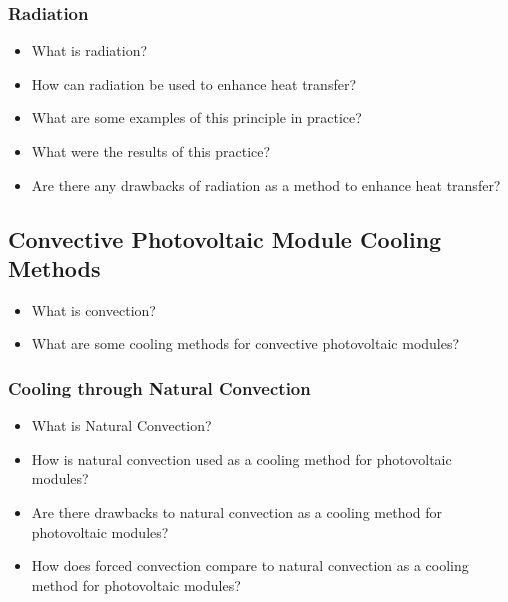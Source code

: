 \subsubsection{Radiation}
\begin{itemize}
    \item What is radiation?
    \item How can radiation be used to enhance heat transfer?
    \item What are some examples of this principle in practice?
    \item What were the results of this practice?
    \item Are there any drawbacks of radiation as a method to enhance heat transfer?
\end{itemize}

\subsection{Convective Photovoltaic Module Cooling Methods}
\begin{itemize}
    \item What is convection?
    \item What are some cooling methods for convective photovoltaic modules?
\end{itemize}

\subsubsection{Cooling through Natural Convection}
\begin{itemize}
    \item What is Natural Convection?
    \item How is natural convection used as a cooling method for photovoltaic modules?
    \item Are there drawbacks to natural convection as a cooling method for photovoltaic modules?
    \item How does forced convection compare to natural convection as a cooling method for photovoltaic modules?
\end{itemize}

